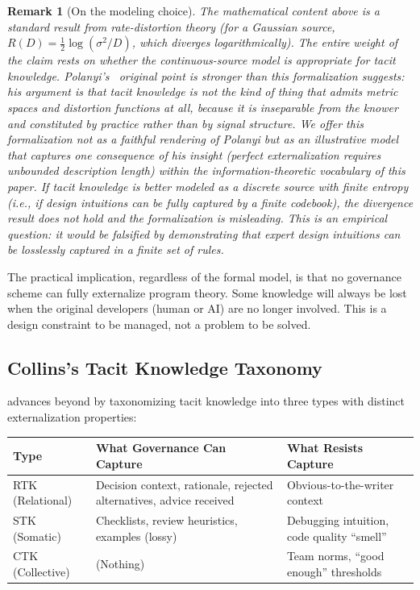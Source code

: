 \documentclass[11pt, a4paper]{googledeepmind}
\newtheorem*{remark}{Remark}
\begin{document}
\begin{remark}[On the modeling choice]
The mathematical content above is a standard result from rate-distortion theory (for a Gaussian source, $R(D) = \frac{1}{2}\log(\sigma^2/D)$, which diverges logarithmically). The entire weight of the claim rests on whether the continuous-source model is appropriate for tacit knowledge. Polanyi's~\citep{polanyi1966} original point is stronger than this formalization suggests: his argument is that tacit knowledge is not the kind of thing that admits metric spaces and distortion functions at all, because it is inseparable from the knower and constituted by practice rather than by signal structure. We offer this formalization not as a faithful rendering of Polanyi but as an illustrative model that captures one consequence of his insight (perfect externalization requires unbounded description length) within the information-theoretic vocabulary of this paper. If tacit knowledge is better modeled as a discrete source with finite entropy (i.e., if design intuitions can be fully captured by a finite codebook), the divergence result does not hold and the formalization is misleading. This is an empirical question: it would be falsified by demonstrating that expert design intuitions can be losslessly captured in a finite set of rules.
\end{remark}

The practical implication, regardless of the formal model, is that no governance scheme can fully externalize program theory. Some knowledge will always be lost when the original developers (human or AI) are no longer involved. This is a design constraint to be managed, not a problem to be solved.

\subsection{Collins's Tacit Knowledge Taxonomy}

\citet{collins2010} advances beyond \citet{polanyi1966} by taxonomizing tacit knowledge into three types with distinct externalization properties:

\begin{center}
\begin{tabular}{lp{5cm}p{5cm}}
\toprule
Type & What Governance Can Capture & What Resists Capture \\
\midrule
RTK (Relational) & Decision context, rationale, rejected alternatives, advice received & Obvious-to-the-writer context \\
STK (Somatic) & Checklists, review heuristics, examples (lossy) & Debugging intuition, code quality ``smell'' \\
CTK (Collective) & (Nothing) & Team norms, ``good enough'' thresholds \\
\bottomrule
\end{tabular}
\end{center}
\end{document}
